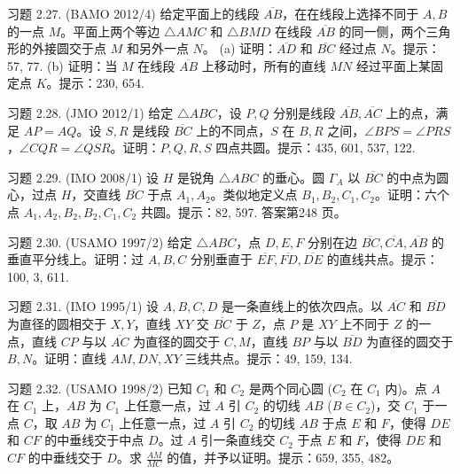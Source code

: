 \begin{exercise}
    习题 2.27. (BAMO 2012/4) 给定平面上的线段 $\overline{AB}$，在在线段上选择不同于 $A, B$ 的一点 $M$。平面上两个等边 $\triangle AMC$ 和 $\triangle BMD$ 在线段 $\overline{AB}$ 的同一侧，两个三角形的外接圆交于点 $M$ 和另外一点 $N$。
(a) 证明：$\overline{AD}$ 和 $\overline{BC}$ 经过点 $N$。提示：57, 77.
(b) 证明：当 $M$ 在线段 $\overline{AB}$ 上移动时，所有的直线 $MN$ 经过平面上某固定点 $K$。提示：230, 654.
\end{exercise}

\begin{exercise}
    习题 2.28. (JMO 2012/1) 给定 $\triangle ABC$，设 $P, Q$ 分别是线段 $\overline{AB}, \overline{AC}$ 上的点，满足 $AP = AQ$。设 $S, R$ 是线段 $\overline{BC}$ 上的不同点，$S$ 在 $B, R$ 之间，$\angle BPS = \angle PRS$，$\angle CQR = \angle QSR$。证明：$P, Q, R, S$ 四点共圆。提示：435, 601, 537, 122.
\end{exercise}

\begin{exercise}
    习题 2.29. (IMO 2008/1) 设 $H$ 是锐角 $\triangle ABC$ 的垂心。圆 $\Gamma_A$ 以 $\overline{BC}$ 的中点为圆心，过点 $H$，交直线 $\overline{BC}$ 于点 $A_1, A_2$。类似地定义点 $B_1, B_2, C_1, C_2$。证明：六个点 $A_1, A_2, B_2, B_2, C_1, C_2$ 共圆。提示：82, 597. 答案第248 页。
\end{exercise}

\begin{exercise}
    习题 2.30. (USAMO 1997/2) 给定 $\triangle ABC$，点 $D, E, F$ 分别在边 $\overline{BC}, \overline{CA}, \overline{AB}$ 的垂直平分线上。证明：过 $A, B, C$ 分别垂直于 $\overline{EF}, \overline{FD}, \overline{DE}$ 的直线共点。提示：100, 3, 611.
\end{exercise}

\begin{exercise}
    习题 2.31. (IMO 1995/1) 设 $A, B, C, D$ 是一条直线上的依次四点。以 $\overline{AC}$ 和 $\overline{BD}$ 为直径的圆相交于 $X, Y$，直线 $XY$ 交 $\overline{BC}$ 于 $Z$，点 $P$ 是 $XY$ 上不同于 $Z$ 的一点，直线 $CP$ 与以 $\overline{AC}$ 为直径的圆交于 $C, M$，直线 $BP$ 与以 $\overline{BD}$ 为直径的圆交于 $B, N$。证明：直线 $AM, DN, XY$ 三线共点。提示：49, 159, 134.
\end{exercise}

\begin{exercise}
    习题 2.32. (USAMO 1998/2) 已知 $C_1$ 和 $C_2$ 是两个同心圆 ($C_2$ 在 $C_1$ 内)。点 $A$ 在 $C_1$ 上，$AB$ 为 $C_1$ 上任意一点，过 $A$ 引 $C_2$ 的切线 $AB$ ($B \in C_2$)，交 $C_1$ 于一点 $C$，取 $AB$ 为 $C_1$ 上任意一点，过 $A$ 引 $C_2$ 的切线 $AB$ 于点 $E$ 和 $F$，使得 $DE$ 和 $CF$ 的中垂线交于中点 $D$。过 $A$ 引一条直线交 $C_2$ 于点 $E$ 和 $F$，使得 $DE$ 和 $CF$ 的中垂线交于 $D$。求 $\frac{AM}{MC}$ 的值，并予以证明。提示：659, 355, 482。
\end{exercise}

